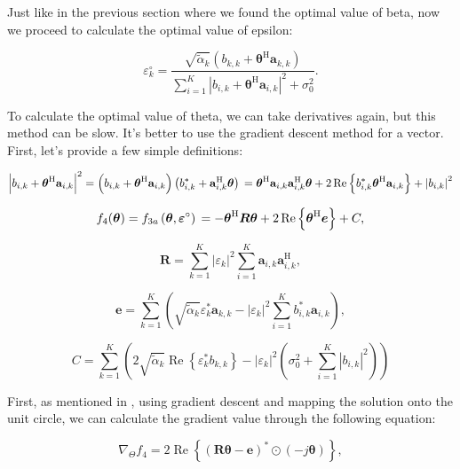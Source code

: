 \documentclass{article}
\begin{document}
Just like in the previous section where we found the optimal value of beta, now we proceed to calculate the optimal value of epsilon:

\[
\varepsilon_{k}^{\circ}=\frac{\sqrt{\tilde{\alpha}_{k}}\left(b_{k, k}+\boldsymbol{\theta}^{\mathrm{H}} \mathbf{a}_{k, k}\right)}{\sum_{i=1}^{K}\left|b_{i, k}+\boldsymbol{\theta}^{\mathrm{H}} \mathbf{a}_{i, k}\right|^{2}+\sigma_{0}^{2}} .
\]

To calculate the optimal value of theta, we can take derivatives again, but this method can be slow. It's better to use the gradient descent method for a vector. First, let's provide a few simple definitions:

\[
\left|b_{i, k}+\boldsymbol{\theta}^{\mathrm{H}} \mathbf{a}_{i, k}\right|^{2}  =\left(b_{i, k}+\boldsymbol{\theta}^{\mathrm{H}} \mathbf{a}_{i, k}\right)\left(b_{i, k}^{*}+\mathbf{a}_{i, k}^{\mathrm{H}} \boldsymbol{\theta}\right) \\
=\boldsymbol{\theta}^{\mathrm{H}} \mathbf{a}_{i, k} \mathbf{a}_{i, k}^{\mathrm{H}} \boldsymbol{\theta}+2 \operatorname{Re}\left\{b_{i, k}^{*} \boldsymbol{\theta}^{\mathrm{H}} \mathbf{a}_{i, k}\right\}+\left|b_{i, k}\right|^{2}
\]

\[	f_{4}(\boldsymbol{\theta})  =f_{3 a}\left(\boldsymbol{\theta}, \boldsymbol{\varepsilon}^{\circ}\right) \\
=-\boldsymbol{\theta}^{\mathrm{H}} \boldsymbol{R} \boldsymbol{\theta}+2 \operatorname{Re}\left\{\boldsymbol{\theta}^{\mathrm{H}} \boldsymbol{e}\right\}+C,
\]

\[	\boldsymbol{R}  =\sum_{k=1}^{K}\left|\varepsilon_{k}\right|^{2} \sum_{i=1}^{K} \mathbf{a}_{i, k} \mathbf{a}_{i, k}^{\mathrm{H}},
\]

\[
\boldsymbol{e}  =\sum_{k=1}^{K}\left(\sqrt{\tilde{\alpha}_{k}} \varepsilon_{k}^{*} \mathbf{a}_{k, k}-\left|\varepsilon_{k}\right|^{2} \sum_{i=1}^{K} b_{i, k}^{*} \mathbf{a}_{i, k}\right),
\]

\[
C  =\sum_{k=1}^{K}\left(2 \sqrt{\tilde{\alpha}_{k}} \operatorname{Re}\left\{\varepsilon_{k}^{*} b_{k, k}\right\}-\left|\varepsilon_{k}\right|^{2}\left(\sigma_{0}^{2}+\sum_{i=1}^{K}\left|b_{i, k}\right|^{2}\right)\right)
\]

First, as mentioned in \cite{15}, using gradient descent and mapping the solution onto the unit circle, we can calculate the gradient value through the following equation:

\[
\nabla_{\Theta} f_{4}=2 \operatorname{Re}\left\{(\mathbf{R \theta}-\mathbf{e})^{*} \odot(-j \mathbf{\theta})\right\},
\]
\end{document}

